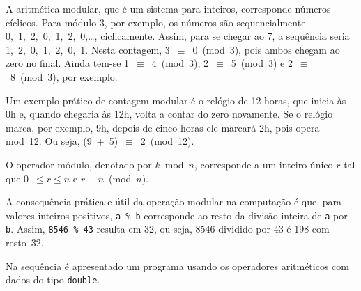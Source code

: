 \documentclass[
  11pt,
  a4paper,
]{scrbook}
\begin{document}
\begin{tcolorbox}[enhanced jigsaw, arc=.35mm, bottomtitle=1mm, colbacktitle=quarto-callout-note-color!10!white, title={Aritmética modular}, toprule=.15mm, left=2mm, opacityback=0, colback=white, colframe=quarto-callout-note-color-frame, opacitybacktitle=0.6, bottomrule=.15mm, leftrule=.75mm, toptitle=1mm, coltitle=black, titlerule=0mm, rightrule=.15mm, breakable]

A aritmética modular, que é um sistema para inteiros, corresponde
números cíclicos. Para módulo 3, por exemplo, os números são
sequencialmente 0,~1,~2,~0,~1,~2,~0,\ldots, ciclicamente. Assim, para se
chegar ao 7, a sequência seria 1,~2,~0,~1,~2,~0,~1. Nesta contagem,
3~\(\equiv\)~0~(mod~3), pois ambos chegam ao zero no final. Ainda tem-se
1~\(\equiv\)~4~(mod~3), 2~\(\equiv\)~5~(mod~3) e 2~\(\equiv\)~8~(mod~3),
por exemplo.

Um exemplo prático de contagem modular é o relógio de 12 horas, que
inicia às 0h e, quando chegaria às 12h, volta a contar do zero
novamente. Se o relógio marca, por exemplo, 9h, depois de cinco horas
ele marcará 2h, pois opera mod~12. Ou seja,
(9~+~5)~\(\equiv\)~2~(mod~12).

O operador módulo, denotado por \(k\)~mod~\(n\), corresponde a um
inteiro único \(r\) tal que 0~\({\leq r \leq n}\) e
\(r \equiv n\)~(mod~\(n\)).

A consequência prática e útil da operação modular na computação é que,
para valores inteiros positivos, \texttt{a\ \%\ b} corresponde ao resto
da divisão inteira de \texttt{a} por \texttt{b}. Assim,
\texttt{8546\ \%\ 43} resulta em 32, ou seja, 8546 dividido por 43 é 198
com resto~32.

\end{tcolorbox}

Na sequência é apresentado um programa usando os operadores aritméticos
com dados do tipo \texttt{double}.
\end{document}

